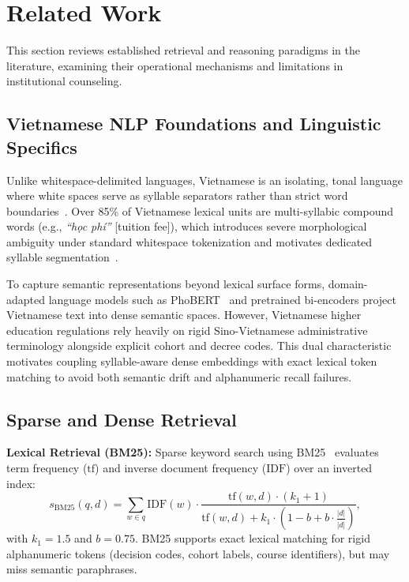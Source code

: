 \section{Related Work}
\label{sec:related}

This section reviews established retrieval and reasoning paradigms in the literature, examining their operational mechanisms and limitations in institutional counseling.

\subsection{Vietnamese NLP Foundations and Linguistic Specifics}
\label{sec:vietnamese_nlp}

Unlike whitespace-delimited languages, Vietnamese is an isolating, tonal language where white spaces serve as syllable separators rather than strict word boundaries~\cite{nguyen2020phobert}. Over 85\% of Vietnamese lexical units are multi-syllabic compound words (e.g., \textit{``h\d{o}c ph\'i''} [tuition fee]), which introduces severe morphological ambiguity under standard whitespace tokenization and motivates dedicated syllable segmentation~\cite{vu2018vncorenlp}. 

To capture semantic representations beyond lexical surface forms, domain-adapted language models such as PhoBERT~\cite{nguyen2020phobert} and pretrained bi-encoders project Vietnamese text into dense semantic spaces. However, Vietnamese higher education regulations rely heavily on rigid Sino-Vietnamese administrative terminology alongside explicit cohort and decree codes. This dual characteristic motivates coupling syllable-aware dense embeddings with exact lexical token matching to avoid both semantic drift and alphanumeric recall failures.

\subsection{Sparse and Dense Retrieval}
\label{sec:sparse_dense}

\textbf{Lexical Retrieval (BM25):} Sparse keyword search using BM25~\cite{robertson2009bm25} evaluates term frequency ($\mathrm{tf}$) and inverse document frequency ($\mathrm{IDF}$) over an inverted index:
\begin{equation}
  s_{\mathrm{BM25}}(q, d) = \sum_{w \in q} \mathrm{IDF}(w) \cdot \frac{\mathrm{tf}(w, d) \cdot (k_1 + 1)}{\mathrm{tf}(w, d) + k_1 \cdot \left(1 - b + b \cdot \frac{|d|}{\overline{|d|}}\right)},
\end{equation}
with $k_1 = 1.5$ and $b = 0.75$. BM25 supports exact lexical matching for rigid alphanumeric tokens (decision codes, cohort labels, course identifiers), but may miss semantic paraphrases.

